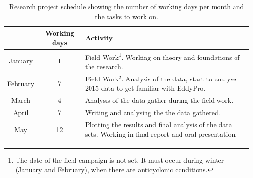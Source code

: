 \documentclass[a4paper,12pt]{article}
\begin{document}
\begin{table}[ht!]
\begin{center}
\begin{tabular}{|c|c|p{9.5cm}|}
\hline
  & \textbf{Working days} & \textbf{Activity} \\
\hline
January & 1 & Field Work\footnote{\label{note1}The date of the field campaign is not set. It must occur during winter (January and February), when there are anticyclonic conditions.}. Working on theory and foundations of the research.\\
\hline
February & 7 & Field Work$^2$. Analysis of the data, start to analyse 2015 data to get familiar with EddyPro.\\
\hline
March & 4 & Analysis of the data gather during the field work.\\
\hline
April & 7 & Writing and analysing the the data gathered.\\
\hline
May & 12 & Plotting the results and final analysis of the data sets. Working in final report and oral presentation.\\
\hline
\end{tabular}
\caption{Research project schedule showing the number of working days per month and the tasks to work on.}
\label{table:schedule}
\end{center}
\end{table}



\clearpage


\end{document}
